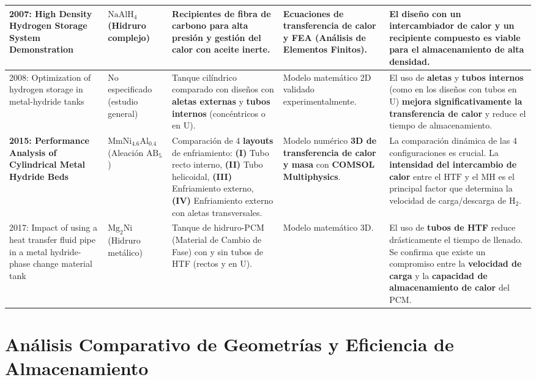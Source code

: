 \documentclass{article}
\begin{document}
\begin{table}[!ht]
\begin{tabular}{>{\raggedright}m{2.5cm}|>{\raggedright}m{2.5cm}|>{\raggedright}m{3.5cm}|>{\raggedright}m{2.5cm}|>{\raggedright\arraybackslash}m{4cm}}
2007: High Density Hydrogen Storage System Demonstration & $\text{NaAlH}_4$ (Hidruro complejo) & Recipientes de \textbf{fibra de carbono} para alta presión y gestión del calor con aceite inerte. & Ecuaciones de transferencia de calor y FEA (Análisis de Elementos Finitos). & El diseño con un \textbf{intercambiador de calor} y un recipiente compuesto es viable para el \textbf{almacenamiento de alta densidad}. \\
\midrule
2008: Optimization of hydrogen storage in metal-hydride tanks & No especificado (estudio general) & Tanque cilíndrico comparado con diseños con \textbf{aletas externas} y \textbf{tubos internos} (concéntricos o en U). & Modelo matemático 2D validado experimentalmente. & El uso de \textbf{aletas} y \textbf{tubos internos} (como en los diseños con tubos en U) \textbf{mejora significativamente la transferencia de calor} y reduce el tiempo de almacenamiento. \\
\midrule
\textbf{2015: Performance Analysis of Cylindrical Metal Hydride Beds} & $\text{MmNi}_{4.6}\text{Al}_{0.4}$ (Aleación $\text{AB}_5$) & Comparación de 4 \textbf{layouts} de enfriamiento: \textbf{(I)} Tubo recto interno, \textbf{(II)} Tubo helicoidal, \textbf{(III)} Enfriamiento externo, \textbf{(IV)} Enfriamiento externo con aletas transversales. & Modelo numérico \textbf{3D de transferencia de calor y masa} con \textbf{COMSOL Multiphysics}. & La comparación dinámica de las 4 configuraciones es crucial. La \textbf{intensidad del intercambio de calor} entre el $\text{HTF}$ y el $\text{MH}$ es el principal factor que determina la velocidad de carga/descarga de $\text{H}_2$. \\
\midrule
2017: Impact of using a heat transfer fluid pipe in a metal hydride-phase change material tank & $\text{Mg}_2\text{Ni}$ (Hidruro metálico) & Tanque de hidruro-PCM (Material de Cambio de Fase) con y sin tubos de HTF (rectos y en U). & Modelo matemático 3D. & El uso de \textbf{tubos de HTF} reduce drásticamente el tiempo de llenado. Se confirma que existe un compromiso entre la \textbf{velocidad de carga} y la \textbf{capacidad de almacenamiento de calor} del $\text{PCM}$. \\
\bottomrule
\end{tabular}
\end{table}

\section{Análisis Comparativo de Geometrías y Eficiencia de Almacenamiento}
\end{document}
